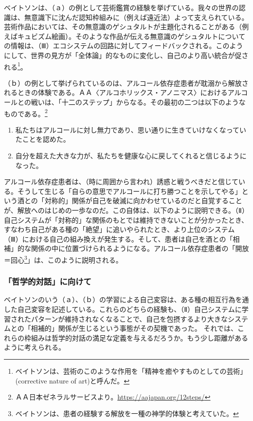\documentclass[b5j,twoside,twocolumn]{utarticle}
\begin{document}
ベイトソンは、（ａ）の例として芸術鑑賞の経験を挙げている。我々の世界の認識は、無意識下に沈んだ認知枠組みに（例えば遠近法）よって支えられている。芸術作品においては、その無意識のゲシュタルトが主題化されることがある（例えばキュビズム絵画）。そのような作品が伝える無意識のゲシュタルトについての情報は、（Ⅲ）エコシステムの回路に対してフィードバックされる。このようにして、世界の見方が「全体論」的なものに変化し、自己のより高い統合が促される\footnote{ベイトソンは、芸術のこのような作用を「精神を癒やすものとしての芸術」(corrective nature of art)と呼んだ。}。


（ｂ）の例として挙げられているのは、アルコール依存症患者が耽溺から解放されるときの体験である。ＡＡ〈アルコホリックス・アノニマス〉におけるアルコールとの戦いは、「十二のステップ」からなる。その最初の二つは以下のようなものである。\footnote{ＡＡ日本ゼネラルサービスより。\url{https://aajapan.org/12steps/}}
\begin{enumerate}
\item 私たちはアルコールに対し無力であり、思い通りに生きていけなくなっていたことを認めた。
\item 自分を超えた大きな力が、私たちを健康な心に戻してくれると信じるようになった。
\end{enumerate}

アルコール依存症患者は、（時に周囲から言われ）誘惑と戦うべきだと信じている。そうして生じる「自らの意思でアルコールに打ち勝つことを示してやる」という酒との「対称的」関係が自己を破滅に向かわせているのだと自覚することが、解放へのはじめの一歩なのだ。この自体は、以下のように説明できる。（Ⅱ）自己システムが「対称的」な関係のもとでは維持できないことが分かったとき、すなわち自己がある種の「絶望」に追いやられたとき、より上位のシステム（Ⅲ）における自己の組み換えが発生する。そして、患者は自己を酒との「相補」的な関係の中に位置づけられるようになる。アルコール依存症患者の「開放＝回心\footnote{ベイトソンは、患者の経験する解放を一種の神学的体験と考えていた。}」は、このように説明される。


\subsubsection*{「哲学的対話」に向けて}
ベイトソンのいう（ａ）、（ｂ）の学習による自己変容は、ある種の相互行為を通した自己変容を記述している。これらのどちらの経験も、（Ⅱ）自己システムに学習されたパターンが維持されなくなることで、自己を包摂するより大きなシステムとの「相補的」関係が生じるという事態がその契機であった。
それでは、これらの枠組みは哲学的対話の満足な定義を与えるだろうか。もう少し距離があるように考えられる。
\end{document}
